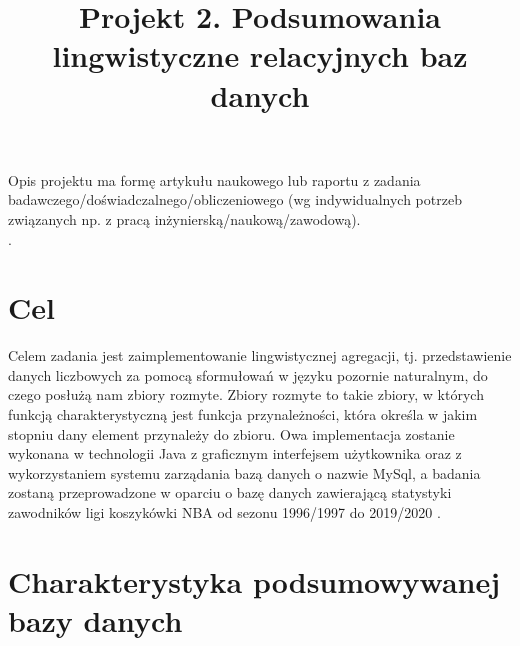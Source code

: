 \documentclass{classrep}
\author{
  \studentinfo{Hubert Gawłowski}{224298} \and
  \studentinfo{Kamil Kiszko-Zgierski}{224328} }
\title{Projekt 2.  Podsumowania lingwistyczne relacyjnych baz danych}
\begin{document}
\maketitle

Opis projektu ma formę artykułu naukowego lub raportu z zadania
badawczego/doświadczalnego/obliczeniowego (wg indywidualnych potrzeb związanych np. z
pracą inżynierską/naukową/zawodową). \\
. 

\section{Cel}
Celem zadania jest zaimplementowanie lingwistycznej agregacji, tj. przedstawienie danych liczbowych za pomocą sformułowań w języku pozornie naturalnym, do czego posłużą nam zbiory rozmyte. Zbiory rozmyte to takie zbiory, w których funkcją charakterystyczną jest funkcja przynależności, która określa w jakim stopniu dany element przynależy do zbioru. Owa implementacja zostanie wykonana w technologii Java z graficznym interfejsem użytkownika oraz z wykorzystaniem systemu zarządania bazą danych o nazwie MySql, a badania zostaną przeprowadzone w oparciu o bazę danych zawierającą statystyki zawodników ligi koszykówki NBA od sezonu 1996/1997 do 2019/2020 \cite{nba_data}.  \\


\section{Charakterystyka podsumowywanej bazy danych}
\end{document}
